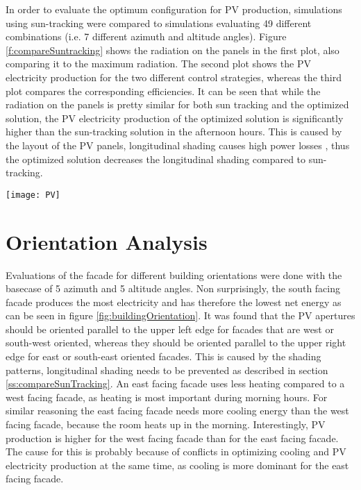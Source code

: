 		In order to evaluate the optimum configuration for PV production, simulations using sun-tracking were compared to simulations evaluating 49 different combinations (i.e. 7 different azimuth and altitude angles). Figure \ref{f:compareSuntracking} shows the radiation on the panels in the first plot, also comparing it to the maximum radiation. The second plot shows the PV electricity production for the two different control strategies, whereas the third plot compares the corresponding efficiencies. It can be seen that while the radiation on the panels is pretty similar for both sun tracking and the optimized solution, the PV electricity production of the optimized solution is significantly higher than the sun-tracking solution in the afternoon hours. This is caused by the layout of the PV panels, longitudinal shading causes high power losses \cite{hofer2015PVSEC}, thus the optimized solution decreases the longitudinal shading compared to sun-tracking. 

		\begin{figure*}
			\begin{center}
			\texttt{[image: PV]}
			\caption{Comparison of optimized solution to sun-tracking. a) average radiation on panels compared to radiation without shading b) PV electricity production comparison c) efficiency comparison}
			\label{f:compareSuntracking}
			\end{center}
		\end{figure*}






\section{Orientation Analysis}

	Evaluations of the facade for different building orientations were done with the basecase of 5 azimuth and 5 altitude angles. Non surprisingly, the south facing facade produces the most electricity and has therefore the lowest net energy as can be seen in figure \ref{fig:buildingOrientation}. It was found that the PV apertures should be oriented parallel to the upper left edge for facades that are west or south-west oriented, whereas they should be oriented parallel to the upper right edge for east or south-east oriented facades. This is caused by the shading patterns, longitudinal shading needs to be prevented as described in section \ref{ss:compareSunTracking}. An east facing facade uses less heating compared to a west facing facade, as heating is most important during morning hours. For similar reasoning the east facing facade needs more cooling energy than the west facing facade, because the room heats up in the morning. Interestingly, PV production is higher for the west facing facade than for the east facing facade. The cause for this is probably because of conflicts in optimizing cooling and PV electricity production at the same time, as cooling is more dominant for the east facing facade. 

